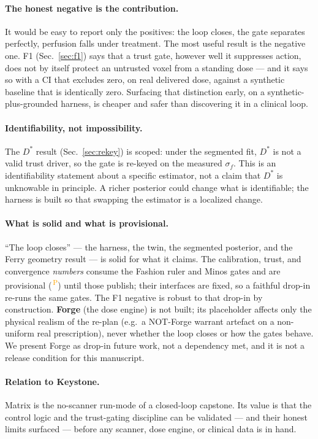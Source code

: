\documentclass[12pt]{iopart}
\newcommand{\PROV}{\textsuperscript{\textcolor{orange}{\,P}}}
\newcommand{\Dstar}{D^{*}}
\newcommand{\sigf}{\sigma_{f}}
\begin{document}
\paragraph{The honest negative is the contribution.} It would be easy to report only the
positives: the loop closes, the gate separates perfectly, perfusion falls under treatment.
The most useful result is the negative one. F1 (Sec.~\ref{sec:f1}) says that a trust gate,
however well it suppresses action, does not by itself protect an untrusted voxel from a
standing dose --- and it says so with a CI that excludes zero, on real delivered dose,
against a synthetic baseline that is identically zero. Surfacing that distinction early,
on a synthetic-plus-grounded harness, is cheaper and safer than discovering it in a
clinical loop.

\paragraph{Identifiability, not impossibility.} The $\Dstar$ result
(Sec.~\ref{sec:rekey}) is scoped: under the segmented fit, $\Dstar$ is not a valid trust
driver, so the gate is re-keyed on the measured $\sigf$. This is an identifiability
statement about a specific estimator, not a claim that $\Dstar$ is unknowable in
principle. A richer posterior could change what is identifiable; the harness is built so
that swapping the estimator is a localized change.

\paragraph{What is solid and what is provisional.} ``The loop closes'' --- the harness,
the twin, the segmented posterior, and the Ferry geometry result --- is solid for what it
claims. The calibration, trust, and convergence \emph{numbers} consume the Fashion ruler
and Minos gates and are provisional (\PROV) until those publish; their interfaces are
fixed, so a faithful drop-in re-runs the same gates. The F1 negative is robust to that
drop-in by construction. \textbf{Forge} (the dose engine) is not built; its placeholder
affects only the physical realism of the re-plan (e.g.\ a NOT-Forge warrant artefact on a
non-uniform real prescription), never whether the loop closes or how the gates behave. We
present Forge as drop-in future work, not a dependency met, and it is not a release
condition for this manuscript.

\paragraph{Relation to Keystone.} Matrix is the no-scanner run-mode of a closed-loop
capstone. Its value is that the control logic and the trust-gating discipline can be
validated --- and their honest limits surfaced --- before any scanner, dose engine, or
clinical data is in hand.
\end{document}

